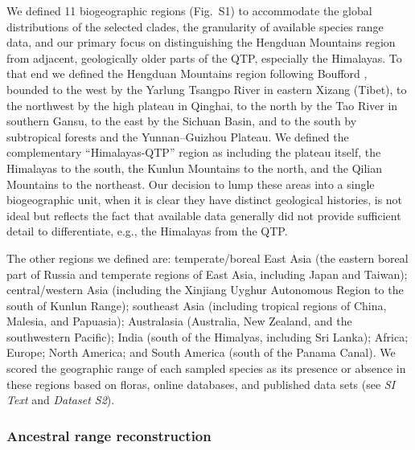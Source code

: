 We defined 11 biogeographic regions (Fig.~S1) to accommodate the global distributions of the selected clades, the granularity of available species range data, and our primary focus on distinguishing the Hengduan Mountains region from adjacent, geologically older parts of the QTP, especially the Himalayas. To that end we defined the Hengduan Mountains region following Boufford \citep{Boufford2014}, bounded to the west by the Yarlung Tsangpo River in eastern Xizang (Tibet), to the northwest by the high plateau in Qinghai, to the north by the Tao River in southern Gansu, to the east by the Sichuan Basin, and to the south by subtropical forests and the Yunnan–Guizhou Plateau. We defined the complementary ``Himalayas-QTP'' region as including the plateau itself, the Himalayas to the south, the Kunlun Mountains to the north, and the Qilian Mountains to the northeast. Our decision to lump these areas into a single biogeographic unit, when it is clear they have distinct geological histories, is not ideal but reflects the fact that available data generally did not provide sufficient detail to differentiate, e.g., the Himalayas from the QTP.

The other regions we defined are: temperate/boreal East Asia (the
eastern boreal part of Russia and temperate regions of East Asia,
including Japan and Taiwan); central/western Asia (including the
Xinjiang Uyghur Autonomous Region to the south of Kunlun Range);
southeast Asia (including tropical regions of China, Malesia, and
Papuasia); Australasia (Australia, New Zealand, and the southwestern
Pacific); India (south of the Himalyas, including Sri Lanka); Africa;
Europe; North America; and South America (south of the Panama
Canal). We scored the geographic range of each sampled species as its
presence or absence in these regions based on floras, online
databases, and published data sets (see \textit{SI Text} and
\textit{Dataset S2}).

\subsubsection*{Ancestral range reconstruction}

